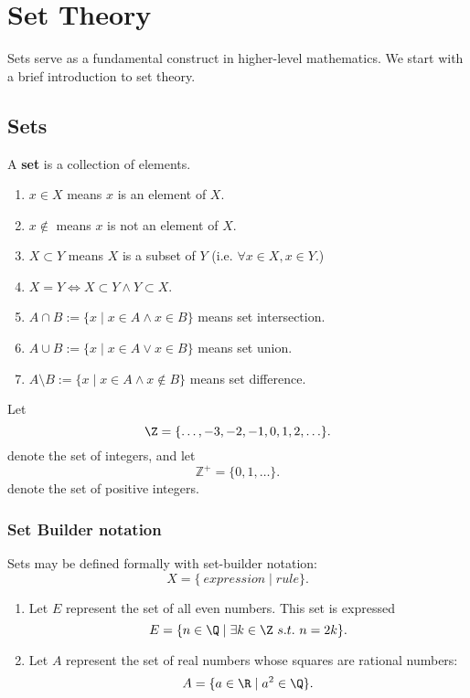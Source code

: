 \documentclass[math0540-lecture-notes.tex]{subfiles}
\begin{document}
\chapter{Set Theory}

Sets serve as a fundamental construct in higher-level mathematics. We start with a brief
introduction to set theory.

\section{Sets}
\begin{definition}[Sets]{}
  A \textbf{set} is a collection of elements.
  \begin{enumerate}
    \item $x \in X$ means $x$ is an element of $X$.
    \item $x \not\in$ means $x$ is not an element of $X$.
    \item $X \subset Y$ means $X$ is a subset of $Y$ (i.e. $\forall x\in X, x\in Y$.)
    \item $X = Y \iff X \subset Y \land Y \subset X$.
    \item $A \cap B := \{x \mid x\in A \land x\in B\}$ means set intersection.
    \item $A \cup B := \{x \mid x\in A \lor x\in B\} $ means set union.
    \item $A \setminus B := \{x \mid x\in A \land x\not\in B\}$ means set difference.
  \end{enumerate}
\end{definition}

\begin{example}
Let \[
  \Z = \{\ldots, -3, -2, -1, 0, 1, 2, \ldots\}
.\] denote the set of integers, and let \[
\mathbb{Z}^+ = \{0, 1, \ldots\} 
.\]  denote the set of positive integers.
\end{example}

\subsection{Set Builder notation}
Sets may be defined formally with set-builder notation: \[
X = \{\ expression \mid rule \} 
.\] 

\begin{example}
  \begin{enumerate}
    \item Let $E$ represent the set of all even numbers. This set is expressed \[
  E = \{n\in \Q\mid \exists k\in \Z~s.t.~n=2k\} 
  .\] 
\item Let $A$ represent the set of real numbers whose squares are rational numbers: \[
A = \{a\in\R\mid a^2\in \Q\} 
.\] 
  \end{enumerate}
\end{example}
\end{document}
